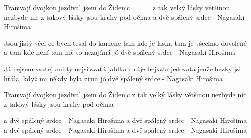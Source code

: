 \resetVars
{}
\MakeHeader
\Lyrics

Tramvají dvojkou jezdíval jsem do Židenic~~~~~~
z tak velký lásky většinou nezbyde nic
z takový lásky jsou kruhy pod očima
a dvě spálený srdce - Nagasaki Hirošima~~~~~~~~~

Jsou jistý věci co bych tesal do kamene
tam kde je láska tam je všechno dovolené
a tam kde není tam mě to nezajímá
jó dvě spálený srdce - Nagasaki Hirošima

Já nejsem svatej ani ty nejsi svatá
jablka z ráje bejvala jedovatá
jenže hezky jsi hřála, když mi někdy byla zima
jó dvě spálený srdce - Nagasaki Hirošima

Tramvají dvojkou jezdíval jsem do Židenic
z tak velký lásky většinou nezbyde nic
z takový lásky jsou kruhy pod očima

a dvě spálený srdce - Nagasaki Hirošima
a dvě spálený srdce - Nagasaki Hirošima
a dvě spálený srdce - Nagasaki Hirošima
a dvě spálený srdce - Nagasaki Hirošima

\Next
